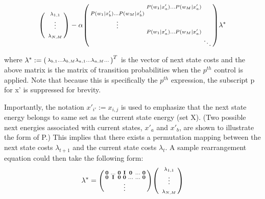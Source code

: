 \documentclass[conference]{IEEEtran}
\begin{document}
\begin{gather}\label{eq:mtxLPineq}
\begin{psmallmatrix}
& \lambda_{1,1}\\
& \vdots\\
& \\
& \lambda_{N,M}
\end{psmallmatrix}
-
\alpha
\begin{psmallmatrix}
& P(w_{1}|x'_{a}) \hdots  P(w_{M}|x'_{a})  \\
P(w_{1}|x'_{b}) \hdots  P(w_{M}|x'_{b}) \\
\vdots\\
& P(w_{1}|x'_{a}) \hdots  P(w_{M}|x'_{a})  \\
& & \ddots
\end{psmallmatrix}
\lambda^{*}\end{gather}


where $\lambda^{*} := \begin{psmallmatrix}
\lambda_{b,1} \hdots \lambda_{b,M} \lambda_{a,1}\hdots \lambda_{a,M} \hdots \end{psmallmatrix}^{T}$ is the vector of next state costs and the above matrix is the matrix of transition probabilities when the $p^{th}$ control is applied. Note that because this is specifically the $p^{th}$ expression, the subscript p for x' is suppressed for brevity.

Importantly, the notation $x'_{i'}:=x_{i,j}$ is used to emphasize that the next state energy belongs to same set as the current state energy (set X). (Two possible next energies associated with current states, $x'_{a}$ and $x'_{b}$, are shown to illustrate the form of P.) This implies that there exists a permutation mapping between the next state costs $\lambda_{t+1}$ and the current state costs $\lambda_{t}$. A sample rearrangement equation could then take the following form:
\begin{gather} \label{eq:permMtx}
\lambda^{*}
=
\begin{psmallmatrix}
    \bold{0} & \hdots & \bold{0} & \bold{I} & \bold{0} & \hdots & \bold{0} \\
    \bold{0} & \bold{I} & \bold{0} & \bold{0} & \hdots & \hdots & \bold{0} \\
    & & & \vdots\\
\end{psmallmatrix}
\begin{psmallmatrix}
    & \lambda_{1,1}\\
    & \vdots\\
    & \\
    & \lambda_{N,M}
\end{psmallmatrix}
\end{gather}
\end{document}
